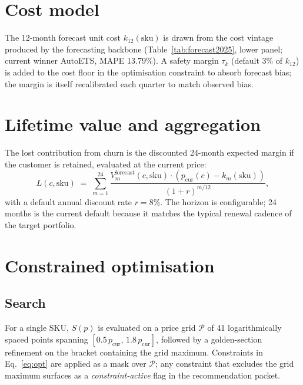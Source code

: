 \documentclass[11pt,a4paper]{article}
\newcommand{\sku}{\mathrm{sku}}
\begin{document}
\section{Cost model}
\label{sec:cost}

The 12-month forecast unit cost $k_{12}(\sku)$ is drawn from the cost vintage produced by the forecasting backbone (Table~\ref{tab:forecast2025}, lower panel; current winner AutoETS, MAPE 13.79\%). A safety margin $\tau_k$ (default 3\% of $k_{12}$) is added to the cost floor in the optimisation constraint to absorb forecast bias; the margin is itself recalibrated each quarter to match observed bias.

\section{Lifetime value and aggregation}
\label{sec:ltv}

The lost contribution from churn is the discounted 24-month expected margin if the customer is retained, evaluated at the current price:
\begin{equation}
L(c, \sku) \;=\; \sum_{m=1}^{24} \frac{ V_m^{\text{forecast}}(c, \sku) \cdot (p_{\text{cur}}(c) - k_m(\sku)) }{(1 + r)^{m/12}},
\end{equation}
with a default annual discount rate $r = 8\%$. The horizon is configurable; 24 months is the current default because it matches the typical renewal cadence of the target portfolio.

\section{Constrained optimisation}

\subsection{Search}
For a single SKU, $S(p)$ is evaluated on a price grid $\mathcal{P}$ of 41 logarithmically spaced points spanning $[0.5\, p_{\text{cur}},\, 1.8\, p_{\text{cur}}]$, followed by a golden-section refinement on the bracket containing the grid maximum. Constraints in Eq.~\ref{eq:opt} are applied as a mask over $\mathcal{P}$; any constraint that excludes the grid maximum surfaces as a \emph{constraint-active} flag in the recommendation packet.
\end{document}

